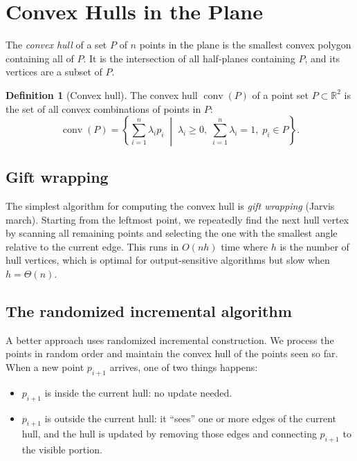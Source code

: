 \documentclass[twoside,12pt]{book}
\theoremstyle{plain}
\theoremstyle{definition}
\newtheorem{definition}[theorem]{Definition}
\theoremstyle{remark}
\begin{document}
\section{Convex Hulls in the Plane}
\label{sec:convex-hull}

The \emph{convex hull} of a set $P$ of $n$ points in the plane is the smallest convex polygon containing all of $P$. It is the intersection of all half-planes containing $P$, and its vertices are a subset of $P$.

\begin{definition}[Convex hull]
The convex hull $\operatorname{conv}(P)$ of a point set $P \subset \mathbb{R}^2$ is the set of all convex combinations of points in $P$:
\[
\operatorname{conv}(P) = \left\{ \sum_{i=1}^{n} \lambda_i p_i \;\middle|\; \lambda_i \geq 0,\; \sum_{i=1}^{n} \lambda_i = 1,\; p_i \in P \right\}.
\]
\end{definition}

\subsection{Gift wrapping}

The simplest algorithm for computing the convex hull is \emph{gift wrapping} (Jarvis march). Starting from the leftmost point, we repeatedly find the next hull vertex by scanning all remaining points and selecting the one with the smallest angle relative to the current edge. This runs in $O(nh)$ time where $h$ is the number of hull vertices, which is optimal for output-sensitive algorithms but slow when $h = \Theta(n)$.

\subsection{The randomized incremental algorithm}

A better approach uses randomized incremental construction. We process the points in random order and maintain the convex hull of the points seen so far. When a new point $p_{i+1}$ arrives, one of two things happens:
\begin{itemize}[nosep]
    \item $p_{i+1}$ is inside the current hull: no update needed.
    \item $p_{i+1}$ is outside the current hull: it ``sees'' one or more edges of the current hull, and the hull is updated by removing those edges and connecting $p_{i+1}$ to the visible portion.
\end{itemize}
\end{document}
